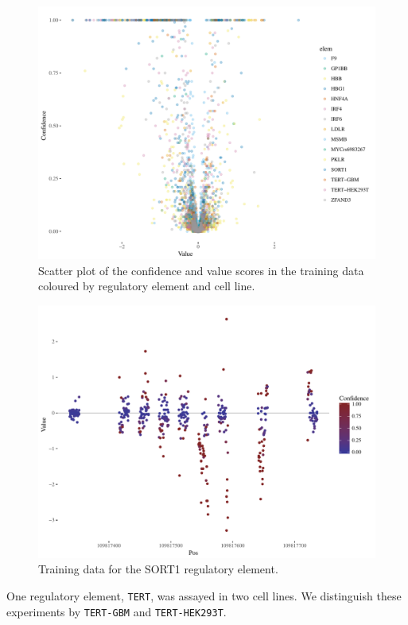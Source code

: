 \documentclass{article}
\begin{document}
\begin{figure}[ht]
\includegraphics[width=\textwidth]{fig-conf-value-scatter}
\caption{Scatter plot of the confidence and value scores in the training data coloured
by regulatory element and cell line.}
\label{fig:conf-value}
\end{figure}

\begin{figure}[ht]
\includegraphics[width=\textwidth]{fig-value-conf-SORT1}
\caption{Training data for the SORT1 regulatory element.}
\label{fig:training-sort1}
\end{figure}

One regulatory element, \texttt{TERT}, was assayed in two cell lines. We
distinguish these experiments by \texttt{TERT-GBM} and \texttt{TERT-HEK293T}.
\end{document}
